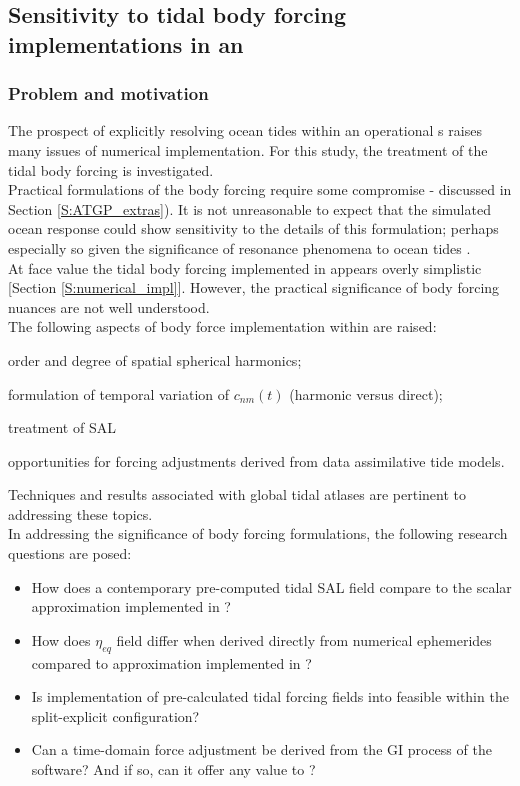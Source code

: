 \newpage
\subsection{Sensitivity to tidal body forcing implementations in an \OGCM{}}
\label{S:plan_bodyforcing}


\subsubsection{Problem and motivation}

The prospect of explicitly resolving ocean tides within an operational \OGCM{}s raises many issues of numerical implementation. For this study, the treatment of the tidal body forcing is investigated.\\  
Practical formulations of the body forcing require some compromise - discussed in Section \ref{S:ATGP_extras}).   It is not unreasonable to expect that the simulated ocean response could show sensitivity to the details of this formulation; perhaps especially so given the significance of resonance phenomena to ocean tides \citep{Muller:2008hs}.\\



At face value the tidal body forcing implemented in \MOM{} appears overly simplistic [Section \ref{S:numerical_impl}].  However, the practical significance of body forcing nuances are not well understood.  \\
The following aspects of body force implementation within \MOM{} are raised:
\begin{inparaenum}[(a)]
\item order and degree of spatial spherical harmonics;
\item formulation of temporal variation of $c_{nm}(t)$ (harmonic versus direct);
\item treatment of SAL
\item opportunities for forcing adjustments derived from data assimilative tide models.
\end{inparaenum}

Techniques and results associated with global tidal atlases are pertinent to addressing these topics.\\



In addressing the significance of body forcing formulations, the following research questions are posed:
\begin{itemize}
\item How does a contemporary pre-computed tidal SAL field compare to the scalar approximation implemented in \MOM{}?
\item How does $\eta_{eq}$ field differ when derived directly from numerical ephemerides compared to approximation implemented in \MOM{}?
\item Is implementation of pre-calculated tidal forcing fields into \MOM{} feasible within the split-explicit configuration?
\item Can a time-domain force adjustment be derived from the GI process of the \OTIS{} software?  And if so, can it offer any value to \MOM{}?
\end{itemize}



